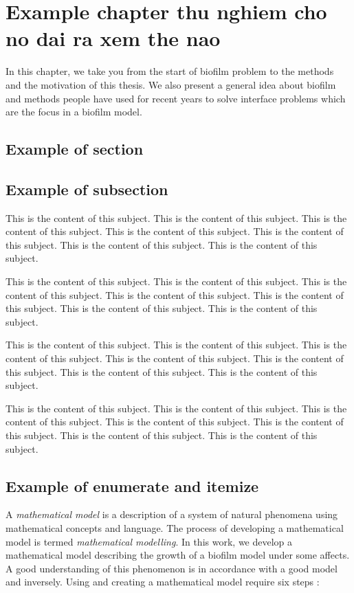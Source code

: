 \documentclass[../main.tex]{subfiles}
\begin{document}
\chapter{Example chapter thu nghiem cho no dai ra xem the nao}

In this chapter, we take you from the start of biofilm problem to the methods and the motivation of this thesis. We also present a general idea about biofilm and methods people have used for recent years to solve interface problems which are the focus in a biofilm model.

\section{Example of section}

\section{Example of subsection}

 This is the content of this subject. This is the content of this subject. This is the content of this subject. This is the content of this subject. This is the content of this subject. This is the content of this subject. This is the content of this subject.

This is the content of this subject. This is the content of this subject. This is the content of this subject. This is the content of this subject. This is the content of this subject. This is the content of this subject. This is the content of this subject.

 This is the content of this subject. This is the content of this subject. This is the content of this subject. This is the content of this subject. This is the content of this subject. This is the content of this subject. This is the content of this subject.

This is the content of this subject. This is the content of this subject. This is the content of this subject. This is the content of this subject. This is the content of this subject. This is the content of this subject. This is the content of this subject. 

\section{Example of enumerate and itemize}

A \textit{mathematical model} is a description of a system of natural phenomena using mathematical concepts and language. The process of developing a mathematical model is termed \textit{mathematical modelling}. In this work, we develop a mathematical model describing the growth of a biofilm model under some affects. A good understanding of this phenomenon is in accordance with a good model and inversely. Using and creating a mathematical model require six steps \cite{wannerBook}:
\end{document}
